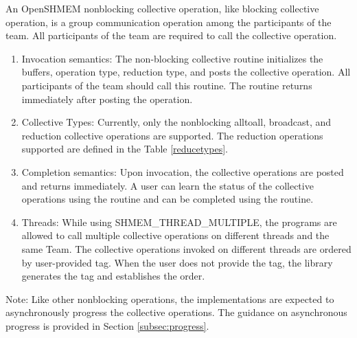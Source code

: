 An OpenSHMEM nonblocking collective operation, like blocking collective
operation, is a group communication operation among the
participants of the team. All participants of the team are required to call the
collective operation.

\begin{enumerate}

\item Invocation semantics: The non-blocking collective routine initializes the
buffers, operation type, reduction type, and posts the collective operation. All
participants of the team should call this routine. The routine returns
immediately after posting the operation. 

\item Collective Types: Currently, only the nonblocking alltoall, broadcast, and reduction collective
operations are supported. The reduction operations supported are defined in the
Table \ref{reducetypes}. 

\item Completion semantics: Upon invocation, the collective operations are
posted and returns immediately. A user can learn the status of the collective operations
using the  routine and can be completed using
the  routine.

\item Threads: While using SHMEM\_THREAD\_MULTIPLE, the \openshmem
programs are allowed to call multiple collective operations on different threads
and the same Team. The collective operations invoked on different threads
are ordered by user-provided tag. When the user does not provide the tag, the
library generates the tag and establishes the order.

\end{enumerate}

Note: Like other nonblocking \openshmem operations, the implementations are
expected to asynchronously progress the collective operations. The guidance on
asynchronous progress is provided in Section \ref{subsec:progress}.



